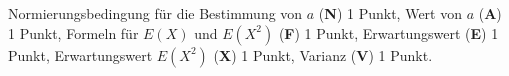 \begin{bewertung}
Normierungsbedingung für die Bestimmung von $a$ ({\bf N}) 1 Punkt,
Wert von $a$ ({\bf A}) 1 Punkt,
Formeln für $E(X)$ und $E(X^2)$ ({\bf F}) 1 Punkt,
Erwartungswert ({\bf E}) 1 Punkt,
Erwartungswert $E(X^2)$ ({\bf X}) 1 Punkt,
Varianz ({\bf V}) 1 Punkt.
\end{bewertung}

